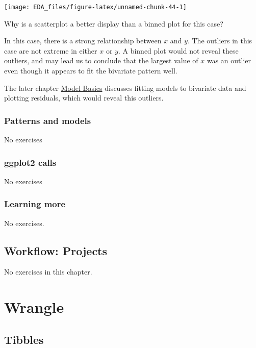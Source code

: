 \documentclass[]{book}
\theoremstyle{definition}
\theoremstyle{definition}
\theoremstyle{definition}
\theoremstyle{remark}
\begin{document}
\begin{center}\texttt{[image: EDA\_files/figure-latex/unnamed-chunk-44-1]} \end{center}

Why is a scatterplot a better display than a binned plot for this case?

In this case, there is a strong relationship between \(x\) and \(y\).
The outliers in this case are not extreme in either \(x\) or \(y\). A
binned plot would not reveal these outliers, and may lead us to conclude
that the largest value of \(x\) was an outlier even though it appears to
fit the bivariate pattern well.

The later chapter \protect\hyperlink{model-basics}{Model Basics}
discusses fitting models to bivariate data and plotting residuals, which
would reveal this outliers.

\hypertarget{patterns-and-models}{%
\section{Patterns and models}\label{patterns-and-models}}

No exercises

\hypertarget{ggplot2-calls}{%
\section{ggplot2 calls}\label{ggplot2-calls}}

No exercises

\hypertarget{learning-more}{%
\section{Learning more}\label{learning-more}}

No exercises.

\hypertarget{workflow-projects}{%
\chapter{Workflow: Projects}\label{workflow-projects}}

No exercises in this chapter.

\hypertarget{part-wrangle}{%
\part{Wrangle}\label{part-wrangle}}

\hypertarget{tibbles}{%
\chapter{Tibbles}\label{tibbles}}
\end{document}
